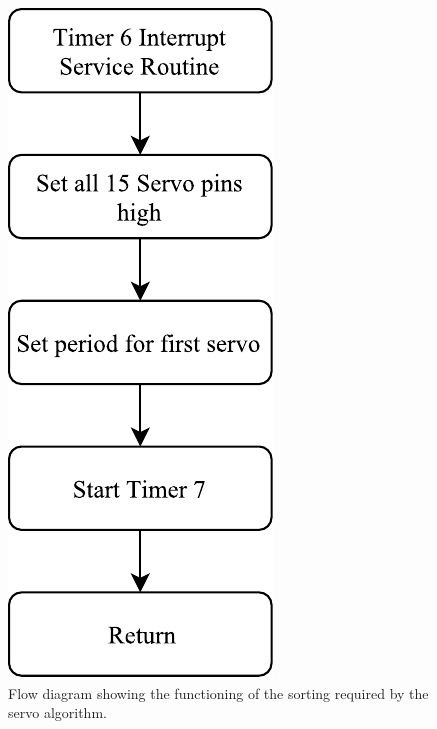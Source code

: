 \begin{figure}[H]
\centering
\includegraphics[scale = 1]{pics/Soft6.pdf}
\caption{Flow diagram showing the functioning of the sorting required by the servo algorithm.}
\label{fig:Soft6}
\end{figure}

